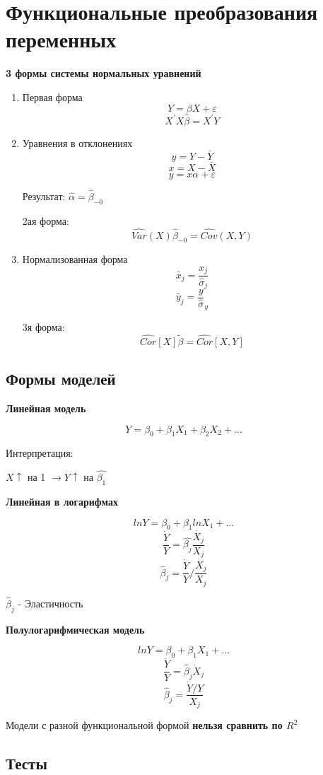 \documentclass[a4paper, 12pt]{article}
\begin{document}
\section{Функциональные преобразования переменных}

\textbf{3 формы системы нормальных уравнений}

\begin{enumerate}
    \item Первая форма
    \[Y = \beta X + \varepsilon\]
    \[X^{\prime}X \hat{\beta} = X^{\prime}Y\]
    \item Уравнения в отклонениях
    \[y = Y - \bar{Y}\]
    \[x = X - \bar{X}\]
    \[y = x\alpha + \varepsilon\]

    Результат: $\hat{\alpha} = \hat{\beta}_{-0}$

    2ая форма:
    \[\hat{Var}(X)\hat{\beta}_{-0} = \hat{Cov}(X, Y)\]
    \item Нормализованная форма
    \[\tilde{x_j} = \frac{x_j}{\hat{\sigma}_{j}}\]
    \[\tilde{y_j} = \frac{y}{\hat{\sigma}}_y\]

    3я форма:
    \[\hat{Cor}[X]\tilde{\beta} = \hat{Cor}[X, Y]\]
\end{enumerate}

\subsection{Формы моделей}

\textbf{Линейная модель}

\[Y = \beta_0 + \beta_1 X_1 + \beta_2 X_2 + \ldots\]

Интерпретация:

$X \uparrow$ на 1 $\rightarrow Y \uparrow$ на $\hat{\beta_1}$

\textbf{Линейная в логарифмах}

\[lnY = \beta_0 + \beta_1 lnX_1 + \ldots\]
\[\frac{\dot{Y}}{Y} = \hat{\beta_j}\frac{\dot{X_j}}{X_j}\]
\[\hat{\beta}_j = \frac{\dot{Y}}{Y} / \frac{\dot{X_j}}{X_j}\]

$\hat{\beta}_j$ - Эластичность

\textbf{Полулогарифмическая модель}

\[lnY = \beta_0 + \beta_1 X_1 + \ldots\]
\[\frac{\dot{Y}}{Y} = \hat{\beta}_j \dot{X}_j\]
\[\hat{\beta}_j = \frac{\dot{Y} / Y}{X_j}\]

Модели с разной функциональной формой 
\textbf{нельзя сравнить по $R^2$}

\subsection{Тесты}
\end{document}
